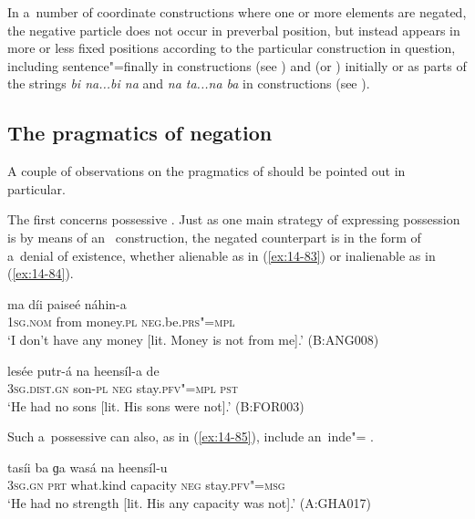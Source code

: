 In a~number of coordinate constructions where one or more elements are negated, the negative particle does not occur in preverbal position, but instead appears in more or less fixed positions according to the particular construction in question, including sentence"=finally in  constructions (see ) and  (or ) initially or as parts of the strings \textit{bi na...bi na} and \textit{na ta...na ba} in  constructions (see ). 


\subsection{The pragmatics of negation}
\label{subsec:14-3-4}


A couple of observations on the pragmatics of  should be pointed out in particular.


The first concerns possessive . Just as one main strategy of expressing possession is by means of an~ construction, the negated counterpart is in the form of a~denial of existence, whether alienable as in (\ref{ex:14-83}) or inalienable as in (\ref{ex:14-84}).

\begin{exe}
\ex
\label{ex:14-83}
\gll ma díi paiseé náhin-a \\
\textsc{1sg.nom} from money.\textsc{pl} \textsc{neg}.be.\textsc{prs"=mpl}  \\
\glt `I don't have any money [lit. Money is not from me].' (B:ANG008)

\ex
\label{ex:14-84}
\gll lesée putr-á na heensíl-a de \\
\textsc{3sg.dist.gn} son-\textsc{pl} \textsc{neg} stay.\textsc{pfv"=mpl} \textsc{pst}  \\
\glt `He had no sons [lit. His sons were not].' (B:FOR003)
\end{exe}

Such a~possessive  can also, as in (\ref{ex:14-85}), include an~inde"= .

\begin{exe}
\ex
\label{ex:14-85}
\gll tasíi ba ɡa wasá na heensíl-u \\
\textsc{3sg.gn} \textsc{prt} what.kind capacity \textsc{neg} stay.\textsc{pfv"=msg } \\
\glt `He had no strength [lit. His any capacity was not].' (A:GHA017)
\end{exe}

